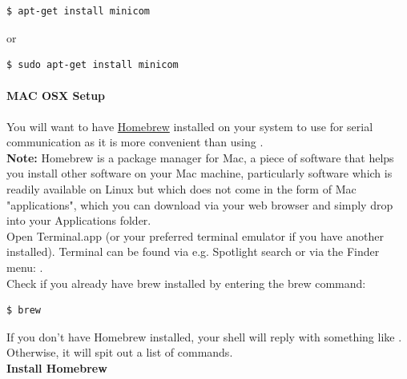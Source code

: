 \begin{lstlisting}[language=bash,morekeywords=$,keywordstyle=\bfseries,frame=none,xleftmargin=.25in,belowskip=2em, aboveskip=2em]
$ apt-get install minicom
\end{lstlisting}

or

\begin{lstlisting}[language=bash,morekeywords=$,keywordstyle=\bfseries,frame=none,xleftmargin=.25in,belowskip=2em, aboveskip=2em]
$ sudo apt-get install minicom
\end{lstlisting}

\paragraph{MAC OSX Setup}

You will want to have \href{https://brew.sh/}{Homebrew} installed on your system to use  for serial communication as it is more convenient than using .\\

\textbf{Note:} Homebrew is a package manager for Mac, a piece of software that helps you install other software on your Mac machine, particularly software which is readily available on Linux but which does not come in the form of Mac "applications", which you can download via your web browser and simply drop into your Applications folder.\\ 

Open Terminal.app (or your preferred terminal emulator if you have another installed). Terminal can be found via e.g. Spotlight search or via the Finder menu: .\\

Check if you already have brew installed by entering the brew command: 

\begin{lstlisting}[language=bash,morekeywords=$,keywordstyle=\bfseries,frame=none,xleftmargin=.25in,belowskip=2em, aboveskip=2em]
$ brew
\end{lstlisting}

If you don't have Homebrew installed, your shell will reply with something like . Otherwise, it will spit out a list of  commands.\\ 

\textbf{Install Homebrew}\\

